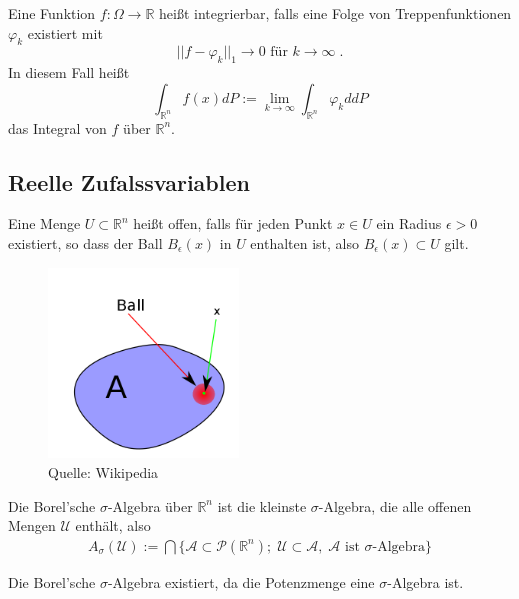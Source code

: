 \begin{Definition}
Eine Funktion $f : \Omega \to \mathbb{R}$ heißt integrierbar, falls eine Folge von Treppenfunktionen  $\varphi_k$ existiert mit
$$ || f -  \varphi_k ||_1 \to 0 \text{ für } k \to \infty \;. $$
In diesem Fall heißt
$$ \int_{\mathbb{R}^n} f(x) dP := \lim_{k \to \infty}  \int_{\mathbb{R}^n}  \varphi_k d dP$$
das Integral von $f$ über $\mathbb{R}^n$.
\end{Definition}


\subsection{Reelle Zufalssvariablen}

\begin{Definition}
Eine Menge $U \subset  \mathbb{R}^n$ heißt offen, falls für jeden Punkt $x \in U$ ein Radius $\epsilon > 0$ existiert, so dass der Ball $B_\epsilon (x)$ in $U$ enthalten ist, also 
$B_\epsilon (x) \subset U$ gilt.
\end{Definition}

\begin{figure}[htp]
      \centering
    \includegraphics[width=0.45\textwidth]{images/openset}
      \caption{Quelle: Wikipedia}
\end{figure}


\begin{Definition}
Die Borel'sche   $\sigma$-Algebra über $\mathbb{R}^n$ ist die kleinste  $\sigma$-Algebra, die alle offenen Mengen $\mathcal{U}$ enthält, also 
\begin{align*}
A_\sigma (\mathcal{U}) := \bigcap \{  \mathcal{A} \subset \mathcal{P}(\mathbb{R}^n);  \;   \mathcal{U}  \subset  \mathcal{A},  \;  \mathcal{A} \text{ ist $\sigma$-Algebra} \}
\end{align*}
\end{Definition}

\begin{Satz}
Die Borel'sche   $\sigma$-Algebra existiert, da die Potenzmenge eine   $\sigma$-Algebra ist.
\end{Satz}

